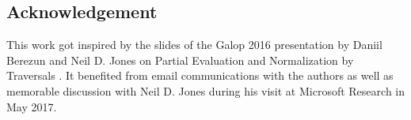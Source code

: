 \documentclass{elsarticle}
\theoremstyle{plain}
\theoremstyle{definition}
\theoremstyle{remark}
\begin{document}

\subsection*{Acknowledgement}
This work got inspired by the slides of the Galop 2016 presentation by Daniil Berezun and Neil D. Jones on Partial Evaluation and Normalization by Traversals \cite{berezunjones_partialevalbytraversals}. It benefited from email communications with the authors as well as memorable discussion with Neil D. Jones during his visit at Microsoft Research in May 2017.



\end{document}

